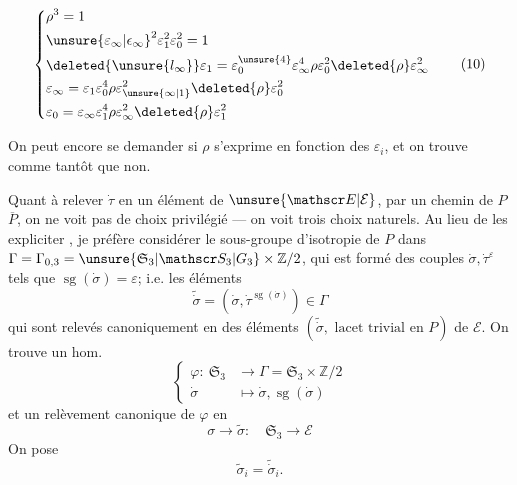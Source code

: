 \[
\left\{\begin{aligned}
&\rho^3=1\\
&\unsure{\varepsilon_\infty|\epsilon_\infty}^{2}\varepsilon_1^2\varepsilon_0^2=1\\
&\deleted{\unsure{l_\infty}}\varepsilon_1=\varepsilon_0^{\unsure{4}}\varepsilon_\infty^4\rho\varepsilon_0^2\deleted{\rho}\varepsilon_\infty^2\\
&\varepsilon_\infty=\varepsilon_1\varepsilon_0^4\rho\varepsilon_{\unsure{\infty|1}}^2\deleted{\rho}\varepsilon_0^2\\
&\varepsilon_0=\varepsilon_\infty\varepsilon_1^4\rho\varepsilon_\infty^2\deleted{\rho}\varepsilon_1^2
\end{aligned}\right.\tag*{(10)}
\]

On peut encore se demander si $\rho$ s'exprime en fonction des $\varepsilon_i$, et on trouve comme tantôt que non.

Quant à relever $\dot\tau$ en un élément de $\unsure{\mathscr E|\mathcal E}$, par un chemin de $P$  $\overline P$, on ne voit pas de choix privilégié --- on voit trois choix  naturels. Au lieu de les expliciter , je préfère considérer le sous-groupe d'isotropie de $P$ dans $\Gamma=\Gamma_{0,3}=\unsure{\mathfrak S_3|\mathscr S_3|G_3}\times\mathbb Z/2$, qui est formé des couples $\dot\sigma,\dot\tau^{\varepsilon}$ tels que $\operatorname{sg}(\dot\sigma)=\varepsilon$;  i.e. les éléments
\[
\widetilde{\dot\sigma}=(\dot\sigma,\dot\tau^{\operatorname{sg}(\dot\sigma)})\in\Gamma
\]
qui sont relevés canoniquement en des éléments $(\widetilde{\dot\sigma},\text{ lacet trivial en }P)$ de $\mathscr E$. On trouve un hom.
\[
\left\{\begin{aligned}
\varphi:\ \mathfrak S_3&\longrightarrow\Gamma=\mathfrak S_3\times\mathbb Z/2\\
\dot\sigma&\longmapsto\dot\sigma,\operatorname{sg}(\dot\sigma)
\end{aligned}\right.\tag*{(11)}
\]
et un relèvement canonique de $\varphi$ en
\[
\sigma\longrightarrow\widetilde\sigma:\quad\mathfrak S_3\longrightarrow\mathscr E\tag*{(12)}
\]
On pose
\[
\widetilde\sigma_i=\widetilde{\dot\sigma}_i.
\]

